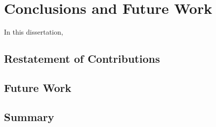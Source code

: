 \chapter{Conclusions and Future Work}

In this dissertation,

\section{Restatement of Contributions}

\section{Future Work}

\section{Summary}

